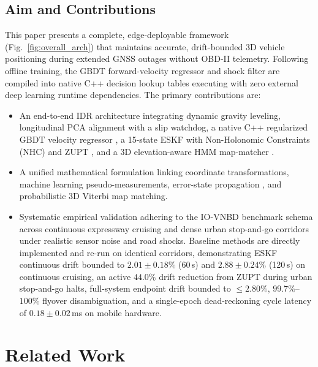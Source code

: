 \documentclass[conference]{IEEEtran}
\begin{document}
\subsection{Aim and Contributions}
This paper presents a complete, edge-deployable framework (Fig.~\ref{fig:overall_arch}) that maintains accurate, drift-bounded 3D vehicle positioning during extended GNSS outages without OBD-II telemetry. Following offline training, the GBDT forward-velocity regressor and shock filter are compiled into native C++ decision lookup tables executing with zero external deep learning runtime dependencies. The primary contributions are:
\begin{itemize}
\item An end-to-end IDR architecture integrating dynamic gravity leveling, longitudinal PCA alignment with a slip watchdog, a native C++ regularized GBDT velocity regressor \cite{friedman2001}, a 15-state ESKF with Non-Holonomic Constraints (NHC) \cite{dissanayake2001} and ZUPT \cite{foxlin2005}, and a 3D elevation-aware HMM map-matcher \cite{newson2009}.
\item A unified mathematical formulation linking coordinate transformations, machine learning pseudo-measurements, error-state propagation \cite{sola2017}, and probabilistic 3D Viterbi map matching.
\item Systematic empirical validation adhering to the IO-VNBD benchmark schema \cite{onyekpe2021} across continuous expressway cruising and dense urban stop-and-go corridors under realistic sensor noise and road shocks. Baseline methods \cite{dissanayake2001, brossard2020} are directly implemented and re-run on identical corridors, demonstrating ESKF continuous drift bounded to $2.01 \pm 0.18\%$ (60\,s) and $2.88 \pm 0.24\%$ (120\,s) on continuous cruising, an active $44.0\%$ drift reduction from ZUPT during urban stop-and-go halts, full-system endpoint drift bounded to $\le 2.80\%$, $99.7\%$--$100\%$ flyover disambiguation, and a single-epoch dead-reckoning cycle latency of $0.18 \pm 0.02$\,ms on mobile hardware.
\end{itemize}

\section{Related Work}
\end{document}
